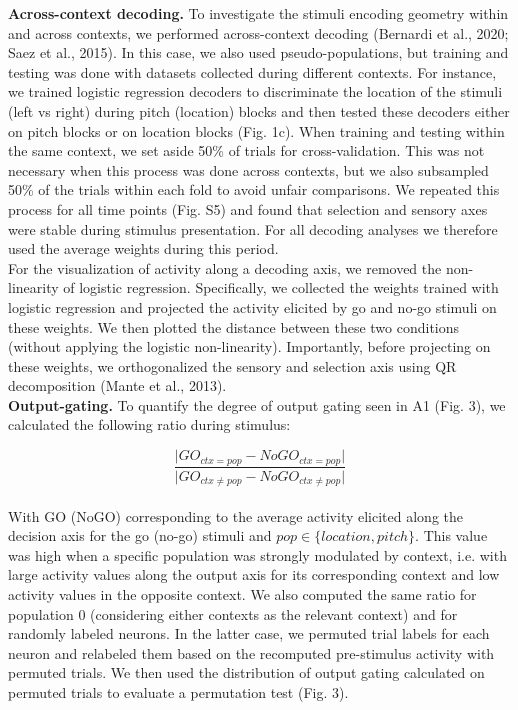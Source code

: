 \documentclass[12pt]{article}
\begin{document}
\textbf{Across-context decoding.} To investigate the stimuli encoding geometry within and across contexts, we performed across-context decoding (Bernardi et al., 2020; Saez et al., 2015). In this case, we also used pseudo-populations, but training and testing was done with datasets collected during different contexts. For instance, we trained logistic regression decoders to discriminate the location of the stimuli (left vs right) during pitch (location) blocks and then tested these decoders either on pitch blocks or on location blocks (Fig. 1c). When training and testing within the same context, we set aside 50\% of trials for cross-validation. This was not necessary when this process was done across contexts, but we also subsampled 50\% of the trials within each fold to avoid unfair comparisons. We repeated this process for all time points (Fig. S5) and found that selection and sensory axes were stable during stimulus presentation. For all decoding analyses we therefore used the average weights during this period. \\

For the visualization of activity along a decoding axis, we removed the non-linearity of logistic regression. Specifically, we collected the weights trained with logistic regression and projected the activity elicited by go and no-go stimuli on these weights. We then plotted the distance between these two conditions (without applying the logistic non-linearity). Importantly, before projecting on these weights, we orthogonalized the sensory and selection axis using QR decomposition (Mante et al., 2013). \\

\textbf{Output-gating.} To quantify the degree of output gating seen in A1 (Fig. 3), we calculated the following ratio during stimulus:

$$ \frac{\vert GO_{ctx = pop} - NoGO_{ctx = pop} \vert }{\vert GO_{ctx \neq pop} - NoGO_{ctx \neq pop} \vert} $$ \\

With GO (NoGO) corresponding to the average activity elicited along the decision axis for the go (no-go) stimuli and $pop \in \{location, pitch\}$. This value was high when a specific population was strongly modulated by context, i.e. with large activity values along the output axis for its corresponding context and low activity values in the opposite context. We also computed the same ratio for population 0 (considering either contexts as the relevant context) and for randomly labeled neurons. In the latter case, we permuted trial labels for each neuron and relabeled them based on the recomputed pre-stimulus activity with permuted trials. We then used the distribution of output gating calculated on permuted trials to evaluate a permutation test (Fig. 3). \\
\end{document}
